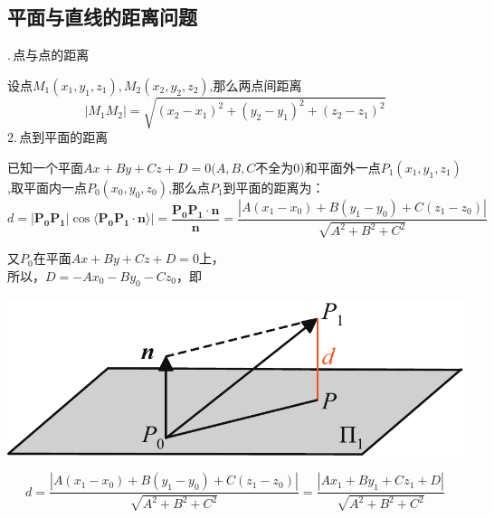 \subsection{平面与直线的距离问题}
.$\,$点与点的距离
\par 设点$M_1(x_1,y_1,z_1),M_2(x_2,y_2,z_2)$,那么两点间距离
\begin{equation}
	|M_1M_2|=\sqrt{(x_2-x_1)^2+(y_2-y_1)^2+(z_2-z_1)^2}
\end{equation}
2.$\,$点到平面的距离
\par 已知一个平面$Ax+By+Cz+D=0(A,B,C$不全为0)和平面外一点$P_1(x_1,y_1,z_1)$,取平面内一点$P_0(x_0,y_0,z_0)$,那么点$P_1$到平面的距离为：
\begin{equation}
	d=|\boldsymbol{P_0P_1}|\cos \langle \boldsymbol{P_0P_1}\cdot \boldsymbol{n} \rangle|=\frac{\boldsymbol{P_0P_1}\cdot \boldsymbol{n}}{\boldsymbol{n}}=\frac{|A(x_1-x_0)+B(y_1-y_0)+C(z_1-z_0)|}{\sqrt{A^2+B^2+C^2}}
\end{equation}

\noindent
\begin{minipage}{0.7\linewidth}
又$P_0$在平面$Ax+By+Cz+D=0$上，\\
所以，$D=-Ax_0-By_0-Cz_0$，即
\end{minipage}
\begin{minipage}{0.3\linewidth}
	\centering
	\includegraphics[width = 0.9\linewidth]{pic/C-5/planed}
	\vspace*{-1em}
	\label{点到平面的距离}
\end{minipage}

\begin{equation}
	d=\frac{|A(x_1-x_0)+B(y_1-y_0)+C(z_1-z_0)|}{\sqrt{A^2+B^2+C^2}}=\frac{|Ax_1+By_1+Cz_1+D|}{\sqrt{A^2+B^2+C^2}}
\end{equation}
\vspace*{-2.5em}
\summarize[\hspace*{2em}联想二维空间中点到直线的距离公式进行记忆：
\begin{equation}
	d=\frac{|Ax_1+By_1+C|}{\sqrt{A^2+B^2}}
	\end{equation}]

